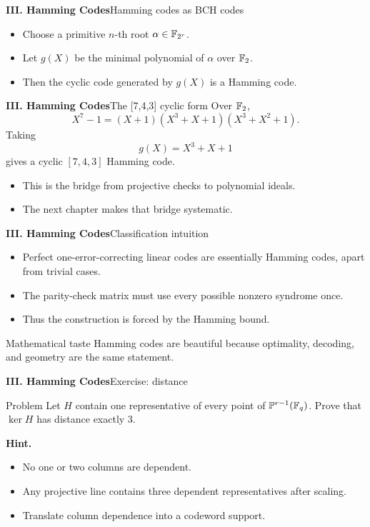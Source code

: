 \begin{frame}{\textbf{III. Hamming Codes}}{Hamming codes as BCH codes}
\small
{}
\begin{itemize}
  \item Choose a primitive $n$-th root $\alpha\in\mathbb{F}_{2^r}$.
  \item Let $g(X)$ be the minimal polynomial of $\alpha$ over $\mathbb{F}_2$.
  \item Then the cyclic code generated by $g(X)$ is a Hamming code.
\end{itemize}
\end{frame}

\begin{frame}{\textbf{III. Hamming Codes}}{The [7,4,3] cyclic form}
\small
Over $\mathbb{F}_2$,
\[
  X^7-1=(X+1)(X^3+X+1)(X^3+X^2+1).
\]
Taking
\[
  g(X)=X^3+X+1
\]
gives a cyclic $[7,4,3]$ Hamming code.
\begin{itemize}
  \item This is the bridge from projective checks to polynomial ideals.
  \item The next chapter makes that bridge systematic.
\end{itemize}
\end{frame}

\begin{frame}{\textbf{III. Hamming Codes}}{Classification intuition}
\small
\begin{itemize}
  \item Perfect one-error-correcting linear codes are essentially Hamming codes, apart from trivial cases.
  \item The parity-check matrix must use every possible nonzero syndrome once.
  \item Thus the construction is forced by the Hamming bound.
\end{itemize}
\begin{block}{Mathematical taste}
Hamming codes are beautiful because optimality, decoding, and geometry are the same statement.
\end{block}
\end{frame}

\begin{frame}{\textbf{III. Hamming Codes}}{Exercise: distance}
\small
\begin{block}{Problem}
Let $H$ contain one representative of every point of $\mathbb{P}^{r-1}(\mathbb{F}_q)$. Prove that $\ker H$ has distance exactly $3$.
\end{block}
\textbf{Hint.}
\begin{itemize}
  \item No one or two columns are dependent.
  \item Any projective line contains three dependent representatives after scaling.
  \item Translate column dependence into a codeword support.
\end{itemize}
\end{frame}

